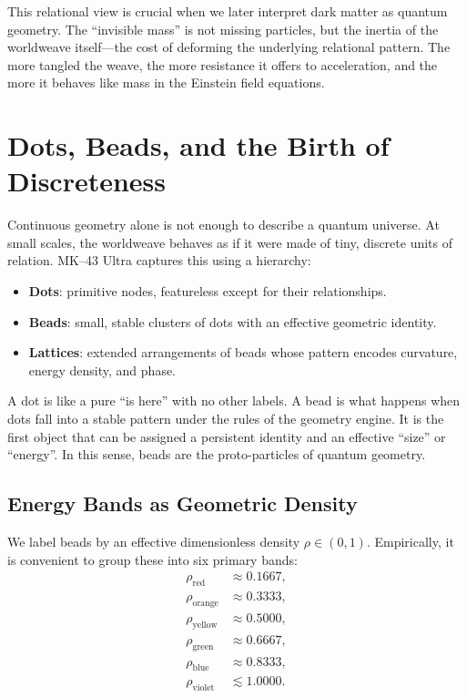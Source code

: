 This relational view is crucial when we later interpret dark matter as quantum
geometry. The ``invisible mass'' is not missing particles, but the inertia of
the worldweave itself---the cost of deforming the underlying relational
pattern. The more tangled the weave, the more resistance it offers to
acceleration, and the more it behaves like mass in the Einstein field
equations.

\chapter{Dots, Beads, and the Birth of Discreteness}
Continuous geometry alone is not enough to describe a quantum universe. At
small scales, the worldweave behaves as if it were made of tiny, discrete
units of relation. MK--43 Ultra captures this using a hierarchy:

\begin{itemize}
  \item \textbf{Dots}: primitive nodes, featureless except for their
  relationships.
  \item \textbf{Beads}: small, stable clusters of dots with an effective
  geometric identity.
  \item \textbf{Lattices}: extended arrangements of beads whose pattern
  encodes curvature, energy density, and phase.
\end{itemize}

A dot is like a pure ``is here'' with no other labels. A bead is what happens
when dots fall into a stable pattern under the rules of the geometry engine. It
is the first object that can be assigned a persistent identity and an effective
``size'' or ``energy''. In this sense, beads are the proto-particles of quantum
geometry.

\section{Energy Bands as Geometric Density}
We label beads by an effective dimensionless density $\rho \in (0,1)$.
Empirically, it is convenient to group these into six primary bands:
\begin{align}
\rho_{\text{red}} &\approx 0.1667,\\
\rho_{\text{orange}} &\approx 0.3333,\\
\rho_{\text{yellow}} &\approx 0.5000,\\
\rho_{\text{green}} &\approx 0.6667,\\
\rho_{\text{blue}} &\approx 0.8333,\\
\rho_{\text{violet}} &\lesssim 1.0000.
\end{align}

